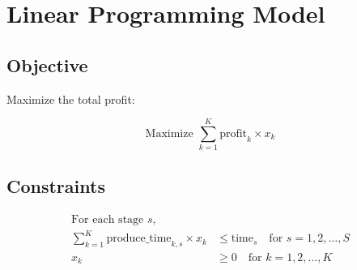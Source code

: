 \documentclass{article}
\begin{document}
\section*{Linear Programming Model}

\subsection*{Objective}
Maximize the total profit:

\[
\text{Maximize } \sum_{k=1}^{K} \text{profit}_k \times x_k
\]

\subsection*{Constraints}

\begin{align*}
\text{For each stage } s, & \\
\sum_{k=1}^{K} \text{produce\_time}_{k, s} \times x_k & \leq \text{time}_s \quad \text{for } s = 1, 2, \ldots, S \\
x_k & \geq 0 \quad \text{for } k = 1, 2, \ldots, K
\end{align*}
\end{document}
